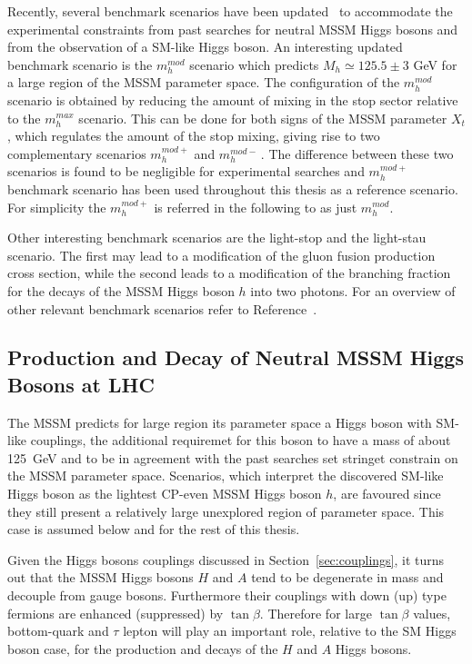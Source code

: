 Recently, several benchmark scenarios have been updated~\cite{LHCxsec} to  
accommodate the experimental constraints from past searches for neutral MSSM Higgs bosons and from the observation of a SM-like Higgs boson.
An interesting updated benchmark scenario is the $m_h^{mod}$ scenario which predicts $M_h \simeq 125.5 \pm 3 $ GeV 
for a large region of the MSSM parameter space.  The configuration of the $m_h^{mod}$ scenario is obtained by reducing the amount 
of mixing in the stop sector relative to  the  $m_h^{max}$ scenario. This can be done for both signs of the MSSM parameter $X_t$, which 
regulates the amount of the stop mixing, giving rise to two complementary scenarios $m_h^{mod+}$ and $m_h^{mod-}\,.$
The difference between these two scenarios is found to be negligible for experimental searches and
 $m_h^{mod+}$ benchmark scenario has been used throughout this thesis as a reference scenario. For simplicity the $m_h^{mod+}$ is referred 
in the following to as just $m_h^{mod}$.

Other interesting benchmark scenarios are the light-stop and the light-stau scenario.
The first may lead to a modification of the gluon fusion production cross section, while the second leads
to a modification of the branching fraction for the decays of the MSSM Higgs boson $h$ into two photons.
For an overview of other relevant  benchmark scenarios refer to Reference~\cite{LHCxsec}. 



 


\subsection{Production and Decay of Neutral MSSM Higgs Bosons at LHC}
The MSSM predicts for large region its parameter space a Higgs boson with SM-like couplings, 
the additional requiremet for this boson to have a mass of about 125~GeV and to be  in agreement with the past 
searches set  stringet constrain on the MSSM parameter space.
Scenarios, which interpret the discovered SM-like Higgs boson as the lightest CP-even MSSM Higgs boson $h$, 
are favoured since they still present a relatively large unexplored region of parameter space. 
This case is assumed below and for the rest of  this thesis.

Given the Higgs bosons couplings discussed in Section~\ref{sec:couplings}, it  turns out that the MSSM Higgs bosons $H$ and $A$
tend to be degenerate in mass and decouple from gauge bosons. Furthermore their couplings
with down (up) type fermions are enhanced (suppressed) by $\tan\beta$. Therefore for large $\tan\beta$ values, 
bottom-quark and $\tau$ lepton will play an important role, relative to the SM Higgs boson case, for the production and decays of the $H$ and $A$ 
Higgs bosons.

